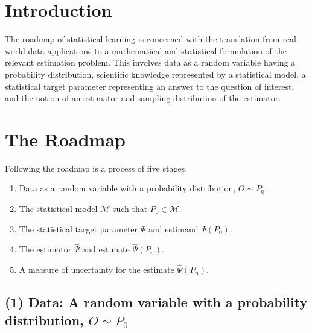 \documentclass[12pt, krantz2,]{book}
\providecommand{\tightlist}{%
  \setlength{\itemsep}{0pt}\setlength{\parskip}{0pt}}
\theoremstyle{definition}
\theoremstyle{definition}
\theoremstyle{definition}
\newcommand{\1}{\mathbbm{1}}
\begin{document}
\hypertarget{introduction}{%
\section*{Introduction}\label{introduction}}


The roadmap of statistical learning is concerned with the translation from
real-world data applications to a mathematical and statistical formulation of
the relevant estimation problem. This involves data as a random variable having
a probability distribution, scientific knowledge represented by a statistical
model, a statistical target parameter representing an answer to the question of
interest, and the notion of an estimator and sampling distribution of the
estimator.

\hypertarget{roadmap}{%
\section{The Roadmap}\label{roadmap}}

Following the roadmap is a process of five stages.

\begin{enumerate}
\def\labelenumi{\arabic{enumi}.}
\tightlist
\item
  Data as a random variable with a probability distribution, \(O \sim P_0\).
\item
  The statistical model \(\mathcal{M}\) such that \(P_0 \in \mathcal{M}\).
\item
  The statistical target parameter \(\Psi\) and estimand \(\Psi(P_0)\).
\item
  The estimator \(\hat{\Psi}\) and estimate \(\hat{\Psi}(P_n)\).
\item
  A measure of uncertainty for the estimate \(\hat{\Psi}(P_n)\).
\end{enumerate}

\hypertarget{data-a-random-variable-with-a-probability-distribution-o-sim-p_0}{%
\subsection*{\texorpdfstring{(1) Data: A random variable with a probability distribution, \(O \sim P_0\)}{(1) Data: A random variable with a probability distribution, O \textbackslash{}sim P\_0}}\label{data-a-random-variable-with-a-probability-distribution-o-sim-p_0}}
\end{document}
